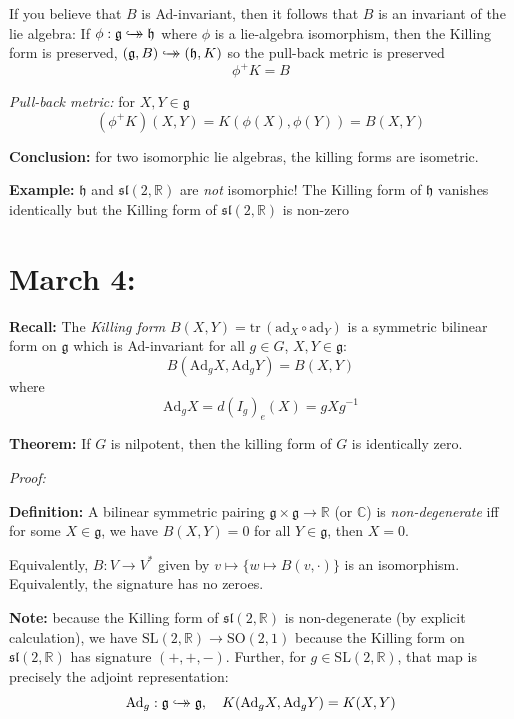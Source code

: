 \documentclass[12pt]{article}
\newcommand{\R}{\mathbb{R}}
\newcommand{\C}{\mathbb{C}}
\newcommand{\SL}{\text{SL}}
\newcommand{\SO}{\text{SO}}
\newcommand{\tr}{\text{tr}\,}
\newcommand{\biject}{\hookrightarrow \hspace{-8pt} \rightarrow}
\newcommand{\g}{\mathfrak{g}}
\newcommand{\h}{\mathfrak{h}}
\renewcommand{\sl}{\mathfrak{sl}}
\newcommand{\Ad}{\text{Ad}}
\newenvironment*{tbox}[2][gray]{
    \begin{tcolorbox}[
        parbox=false,
        colback=#1!5!white,
        colframe=#1!75!black,
        breakable,
        title={#2}
    ]}
    {\end{tcolorbox}}
\begin{document}
    If you believe that $B$ is Ad-invariant, then it follows that $B$ is an invariant of the lie algebra: If $\phi: \g \biject \h$ where $\phi$ is a lie-algebra isomorphism, then the Killing form is preserved, $(\g, B) \biject (\h, K)$ so the pull-back metric is preserved 
    \[\phi^+ K =B\] 

    \emph{Pull-back metric:} for $X, Y \in \g$
    \[(\phi^+ K) (X, Y) = K(\phi(X), \phi(Y)) = B(X, Y)\]

    \textbf{Conclusion:} for two isomorphic lie algebras, the killing forms are isometric.

    \textbf{Example:} $\h$ and $\sl(2,\R)$ are \emph{not} isomorphic! The Killing form of $\h$ vanishes identically but the Killing form of $\sl(2, \R)$ is non-zero

\section{March 4:}
    \textbf{Recall:} The \emph{Killing form} $B(X, Y) = \tr(\text{ad}_X \circ \text{ad}_Y)$ is a symmetric bilinear form on $\g$ which is Ad-invariant for all $g \in G$, $X, Y \in \g$: 
    \[B(\Ad_g X, \Ad_g Y) = B(X, Y)\]
    where 
    \[\Ad_g X = d(I_g)_e(X) = gXg^{-1}\]

    \textbf{Theorem:} If $G$ is nilpotent, then the killing form of $G$ is identically zero. 

    \begin{tbox}{\textbf{Theorem (Cartan's Criterion for Semi-simplicity):} A lie-algebra $\g$ is semi-simple (it has no non-zero solvable ideals) iff the Killing form is non-degenerate.}
        \emph{Proof:} 
    \end{tbox}

    \textbf{Definition:} A bilinear symmetric pairing $\g \times \g \to \R$ (or $\C$) is \emph{non-degenerate} iff for some $X \in \g$, we have $B(X, Y) = 0$ for all $Y \in \g$, then $X = 0$. 
    
    Equivalently, $B: V\to V^*$ given by $v\mapsto \{w \mapsto B(v, \cdot)\}$ is an isomorphism. Equivalently, the signature has no zeroes. 

    \textbf{Note:} because the Killing form of $\sl(2, \R)$ is non-degenerate (by explicit calculation), we have $\SL(2, \R) \to \SO(2, 1)$ because the Killing form on $\sl(2, \R)$ has signature $(+, +, -)$. Further, for $g \in \SL(2, \R)$, that map is precisely the adjoint representation:
    \[\Ad_g: \g \biject \g, \quad K(\Ad_g X, \Ad_g Y) = K(X, Y)\] 
\end{document}
